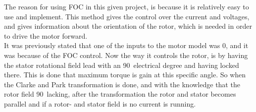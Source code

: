 The reason for using FOC in this given project, is because it is relatively easy to use and implement. This method gives the control over the current and voltages, and gives information about the orientation of the rotor, which is needed in order to drive the motor forward. \\

It was previously stated that one of the inputs to the motor model was $0$, and it was because of the FOC control. Now the way it controls the rotor, is by having the stator rotational field lead with an 90\textdegree\ electrical degree and having locked there. This is done that maximum torque is gain at this specific angle. So when the Clarke and Park transformation is done, and with the knowledge that the rotor field 90\textdegree\ lacking, after the transformation the rotor and stator becomes parallel and if a rotor- and stator field is no current is running.